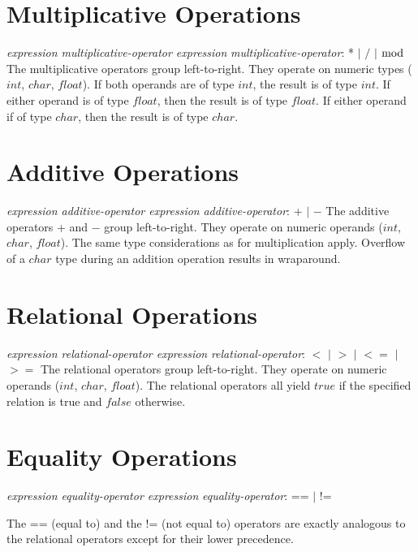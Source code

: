 \begin{homeworkProblem}
    \section{Multiplicative Operations}
    \textit{expression multiplicative-operator expression}
    \newline
    \textit{multiplicative-operator}: * $|$ $/$ $|$ $\bmod$
    \newline
The multiplicative operators group left-to-right. They operate on numeric types ($int$, $char$, $float$). If both operands are of type $int$, the result is of type $int$. If either operand is of type $float$, then the result is of type $float$. If either operand if of type $char$, then the result is of type $char$.

    \section{Additive Operations}
    \textit{expression additive-operator expression}
    \newline
    \textit{additive-operator}: + $|$ $-$
    \newline
The additive operators + and − group left-to-right. They operate on numeric operands ($int$, $char$, $float$). The same type considerations as for multiplication apply. Overflow of a $char$ type during an addition operation results in wraparound.

    \section{Relational Operations}
        \textit{expression relational-operator expression}
    \newline
    \textit{relational-operator}: $<$ $|$ $>$ $|$ $<=$ $|$ $>=$
    \newline
The relational operators group left-to-right. They operate on numeric operands ($int$, $char$, $float$). The relational operators all yield $true$ if the specified relation is true and $false$ otherwise.

    \section{Equality Operations}
    \textit{expression equality-operator expression}
    \newline
    \textit{equality-operator}: == $|$ != 

    The == (equal to) and the != (not equal to) operators are exactly analogous to the relational operators except for their lower precedence.


\end{homeworkProblem}
